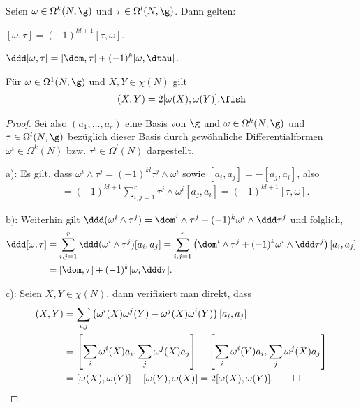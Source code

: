 \documentclass[%
	paper=a5,%
	fleqn,%
	DIV=18,%
	BCOR=0mm,
	fontsize=11pt,
	titlepage=false,%
	bibliography=totoc,
	DIV=18,%
	twoside=true,
	pdftitle=Riemannsche Geometrie,
	pdfauthor=Uwe Semmelmann,
	numbers=noendperiod]%
	{scrbook}
\begin{document}
\begin{lem}
Seien $\omega\in\Omega^k(N,\g)$ und $\tau\in\Omega^l(N,\g)$. Dann gelten:
\begin{propenum}
\item $[\omega,\tau] = (-1)^{kl+1} [\tau,\omega]$.
\item $\ddd[\omega,\tau] = [\dom,\tau] + (-1)^k [\omega,\dtau]$.
\item Für $\omega \in\Omega^1(N,\g)$ und $X,Y\in\chi(N)$ gilt
\begin{align*}
[\omega,\omega](X,Y) = 2[\omega(X),\omega(Y)].\fish
\end{align*}
\end{propenum}
\end{lem}
\begin{proof}
Sei also $(a_1,\ldots,a_r)$ eine Basis von $\g$ und
$\omega\in\Omega^k(N,\g)$ und $\tau\in\Omega^l(N,\g)$  bezüglich dieser Basis
durch gewöhnliche Differentialformen $\omega^i\in\Omega^k(N)$ bzw.
$\tau^i\in\Omega^l(N)$ dargestellt.

a): Es gilt, dass $\omega^i\wedge \tau^j = (-1)^{kl}\tau^j\wedge\omega^i$ sowie
$[a_i,a_j] = -[a_j,a_i]$, also
\begin{align*}
[\omega,\tau] &=  (-1)^{kl+1} \sum_{i,j=1}^r \tau^j \wedge \omega^i [a_j,a_i]
= (-1)^{kl+1}[\tau,\omega].
\end{align*}

b): Weiterhin gilt
$\ddd(\omega^i\wedge \tau^j) = \dom^i \wedge \tau^j + (-1)^k \omega^i
\wedge \ddd\tau^j$ und folglich,
\begin{align*}
\ddd[\omega,\tau] &= \sum_{i,j=1}^r \ddd(\omega^i \wedge \tau^j) [a_i,a_j]
= \sum_{i,j=1}^r \left(\dom^i \wedge \tau^j + (-1)^k \omega^i
\wedge \ddd\tau^j\right) [a_i,a_j]\\
&= [\dom,\tau] + (-1)^k [\omega,\ddd\tau].
\end{align*}

c): Seien $X,Y\in\chi(N)$, dann verifiziert man direkt, dass
\begin{align*}
[\omega,\omega](X,Y) 
&=
\sum_{i,j} \left(\omega^i(X)\omega^j(Y)-\omega^j(X)\omega^i(Y)\right)
[a_i,a_j]\\
&= 
\left[\sum_i \omega^i(X) a_i, \sum_j \omega^j(X) a_j \right]
-
\left[\sum_i \omega^i(Y) a_i, \sum_j \omega^j(X) a_j \right]\\
&= [\omega(X),\omega(Y)]-[\omega(Y),\omega(X)]
= 2[\omega(X),\omega(Y)].\qed
\end{align*}
\end{proof}
\end{document}
